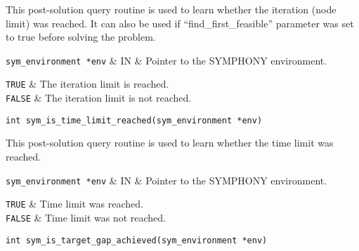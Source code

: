 \bd
\describe

This post-solution query routine is used to learn whether the iteration 
(node limit) was reached. It can also be used if ``find\_first\_feasible'' 
parameter was set to true before solving the problem.

\args

{\tt sym\_environment *env} & IN & Pointer to the SYMPHONY environment.
\et

\returns

{\tt TRUE} & The iteration limit is reached. \\
{\tt FALSE} & The iteration limit is not reached.\\
\et
\ed
\vspace{1ex}


\begin{verbatim}
int sym_is_time_limit_reached(sym_environment *env)
\end{verbatim}

\bd
\describe

This post-solution query routine is used to learn whether the time limit 
was reached. 

\args

{\tt sym\_environment *env} & IN & Pointer to the SYMPHONY environment.
\et

\returns

{\tt TRUE} & Time limit was reached. \\
{\tt FALSE} & Time limit was not reached.\\
\et
\ed
\vspace{1ex}


\begin{verbatim}
int sym_is_target_gap_achieved(sym_environment *env)
\end{verbatim}

\bd
\describe

